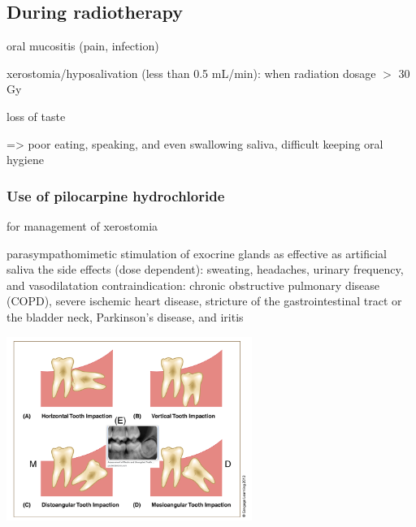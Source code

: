 \documentclass[
paper=landscape,
paper=160mm:90mm, %
fontsize=11pt, %
pagesize, %
parskip=half-, %
]{scrartcl} %
\theoremstyle{mythmstyle} %
\begin{document}
\clearpage
\subsection{During radiotherapy}

 oral mucositis (pain, infection)
 
 xerostomia/hyposalivation (less than 0.5 mL/min): when radiation dosage $>$ 30 Gy

 
 loss of taste
 
 => poor eating, speaking, and even swallowing saliva, difficult keeping oral hygiene
 
\subsubsection{Use of pilocarpine hydrochloride}

 \vspace{0.3cm}
\begin{minipage}[c]{0.45\linewidth}
\begin{outline}

\1 for management of xerostomia

    \2 parasympathomimetic stimulation of exocrine glands
    \2 as effective as artificial saliva
    \2 the side effects (dose dependent): sweating, headaches, urinary frequency, and vasodilatation
\1 contraindication: chronic obstructive pulmonary disease (COPD), severe ischemic heart disease, stricture of the gastrointestinal tract or the bladder neck, Parkinson's disease, and iritis
\end{outline}

\end{minipage}
\begin{minipage}[c]{0.5\linewidth}

\includegraphics[width=8.0cm]{p258.png}
\end{minipage}
\end{document}
